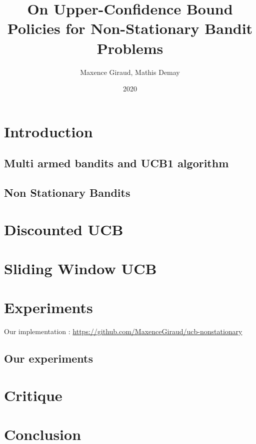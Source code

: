 \documentclass{article}
\title{On Upper-Confidence Bound Policies for Non-Stationary Bandit Problems}
\author{Maxence Giraud, Mathis Demay}
\date{2020}
\begin{document}
\maketitle

\begin{abstract}

	
	
\end{abstract}

\section{Introduction}

	\subsection{Multi armed bandits and UCB1 algorithm}

		

	\subsection{Non Stationary Bandits}

		

\section{Discounted UCB}
	

\section{Sliding Window UCB}

	

\section{Experiments}
Our implementation : \url{https://github.com/MaxenceGiraud/ucb-nonstationary} 
	
	\subsection{Our experiments}
	
		

\section{Critique}

\section{Conclusion}


\end{document}
